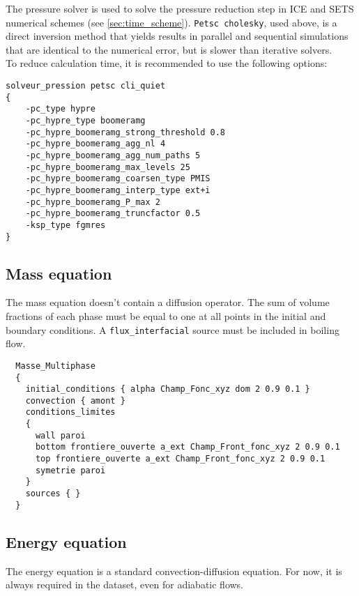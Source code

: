 The pressure solver is used to solve the pressure reduction step in ICE and SETS numerical schemes (see \ref{sec:time_scheme}). \texttt{Petsc cholesky}, used above, is a direct inversion method that yields results in parallel and sequential simulations that are identical to the numerical error, but is slower than iterative solvers.\\
To reduce calculation time, it is recommended to use the following options:
\begin{lstlisting}
solveur_pression petsc cli_quiet
{
    -pc_type hypre
    -pc_hypre_type boomeramg
    -pc_hypre_boomeramg_strong_threshold 0.8
    -pc_hypre_boomeramg_agg_nl 4
    -pc_hypre_boomeramg_agg_num_paths 5
    -pc_hypre_boomeramg_max_levels 25
    -pc_hypre_boomeramg_coarsen_type PMIS
    -pc_hypre_boomeramg_interp_type ext+i
    -pc_hypre_boomeramg_P_max 2
    -pc_hypre_boomeramg_truncfactor 0.5
    -ksp_type fgmres
}
\end{lstlisting}

\subsection{Mass equation}
  
The mass equation doesn't contain a diffusion operator. The sum of volume fractions of each phase must be equal to one at all points in the initial and boundary conditions. A \texttt{flux\_interfacial} source must be included in boiling flow. 

\begin{lstlisting}
  Masse_Multiphase
  {
    initial_conditions { alpha Champ_Fonc_xyz dom 2 0.9 0.1 }
    convection { amont }
    conditions_limites
    {
      wall paroi
      bottom frontiere_ouverte a_ext Champ_Front_fonc_xyz 2 0.9 0.1
      top frontiere_ouverte a_ext Champ_Front_fonc_xyz 2 0.9 0.1
      symetrie paroi
    }
    sources { }
  }
\end{lstlisting}

\subsection{Energy equation}

The energy equation is a standard convection-diffusion equation. For now, it is always required in the dataset, even for adiabatic flows.

